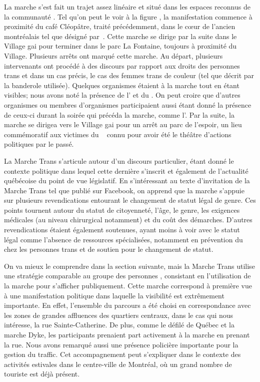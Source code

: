 La marche s'est fait un trajet assez linéaire et situé dans les espaces reconnus de la communauté \lgbt{}.
Tel qu'on peut le voir à la figure , la manifestation commence à proximité du café Cléopâtre, traité précédemment, dans le cœur de l'ancien  montréalais tel que désigné par~\citet{Chamberland1993a}.
Cette marche se dirige par la suite dans le Village gai pour terminer dans le parc La Fontaine, toujours à proximité du Village.
Plusieurs arrêts ont marqué cette marche.
Au départ, plusieurs intervenants ont procédé à des discours par rapport aux droits des personnes trans et dans un cas précis, le cas des femmes trans de couleur (tel que décrit par la banderole utilisée).
Quelques organismes étaient à la marche tout en étant visibles; nous avons noté la présence de l'\atq{} et du \rlq{}.
On peut croire que d'autres organismes ou membres d'organismes participaient aussi étant donné la présence de ceux-ci durant la soirée qui précéda la marche, comme l'\astteq{}.
Par la suite, la marche se dirigea vers le Village gai pour un arrêt au parc de l'espoir, un lieu commémoratif aux victimes du \sida{}~\citep{Lafontaine2012} connu pour avoir été le théâtre d'actions politiques par le passé.

La Marche Trans s'articule autour d'un discours particulier, étant donné le contexte politique dans lequel cette dernière s'inscrit et également de l'actualité québécoise du point de vue législatif.
En s'intéressant au texte d'invitation de la Marche Trans tel que publié sur Facebook, on apprend que la marche s'appuie sur plusieurs revendications entourant le changement de statut légal de genre.
Ces points tournent autour du statut de citoyenneté, l'âge, le genre, les exigences médicales (au niveau chirurgical notamment) et du coût des démarches.
D'autres revendications étaient également soutenues, ayant moins à voir avec le statut légal comme l'absence de ressources spécialisées, notamment en prévention du \vih{} chez les personnes trans et de soutien pour le changement de statut.

On va mieux le comprendre dans la section suivante, mais la Marche Trans utilise une stratégie comparable au groupe des personnes \dyke{}, consistant en l'utilisation de la marche pour s'afficher publiquement.
Cette marche correspond à première vue à une manifestation politique dans laquelle la visibilité est extrêmement importante.
En effet, l'ensemble du parcours a été choisi en correspondance avec les zones de grandes affluences des quartiers centraux, dans le cas qui nous intéresse, la rue Sainte-Catherine.
De plus, comme le défilé de Québec et la marche Dyke, les participants prenaient part activement à la marche en prenant la rue.
Nous avons remarqué aussi une présence policière importante pour la gestion du traffic.
Cet accompagnement peut s'expliquer dans le contexte des activités estivales dans le centre-ville de Montréal, où un grand nombre de touriste est déjà présent.

